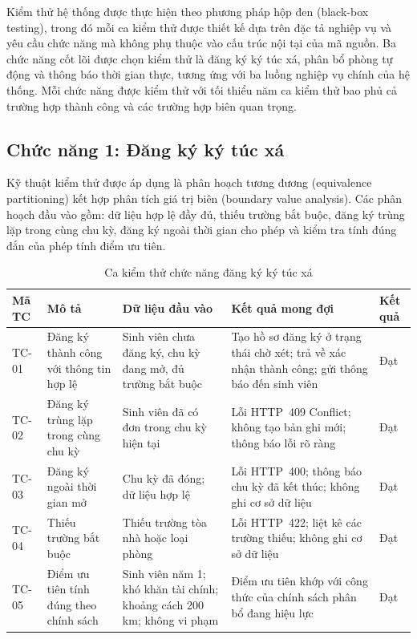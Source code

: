 \documentclass[../DoAn.tex]{subfiles}
\begin{document}
Kiểm thử hệ thống được thực hiện theo phương pháp hộp đen (black-box testing),
trong đó mỗi ca kiểm thử được thiết kế dựa trên đặc tả nghiệp vụ và yêu cầu
chức năng mà không phụ thuộc vào cấu trúc nội tại của mã nguồn. Ba chức năng
cốt lõi được chọn kiểm thử là đăng ký ký túc xá, phân bổ phòng tự động và thông
báo thời gian thực, tương ứng với ba luồng nghiệp vụ chính của hệ thống. Mỗi
chức năng được kiểm thử với tối thiểu năm ca kiểm thử bao phủ cả trường hợp
thành công và các trường hợp biên quan trọng.

\subsection*{Chức năng 1: Đăng ký ký túc xá}

Kỹ thuật kiểm thử được áp dụng là phân hoạch tương đương (equivalence
partitioning) kết hợp phân tích giá trị biên (boundary value analysis). Các
phân hoạch đầu vào gồm: dữ liệu hợp lệ đầy đủ, thiếu trường bắt buộc, đăng ký
trùng lặp trong cùng chu kỳ, đăng ký ngoài thời gian cho phép và kiểm tra tính
đúng đắn của phép tính điểm ưu tiên.

\vspace{-6pt}
\begin{table}[H]
\centering
\caption{Ca kiểm thử chức năng đăng ký ký túc xá}
\label{tab:tc_registration}
\footnotesize

\begin{tabular}{|p{1.1cm}|p{2.5cm}|p{3.2cm}|p{4.0cm}|p{1.2cm}|}
\hline
\textbf{Mã TC} &
\textbf{Mô tả} &
\textbf{Dữ liệu đầu vào} &
\textbf{Kết quả mong đợi} &
\textbf{Kết quả} \\
\hline

TC-01 &
Đăng ký thành công với thông tin hợp lệ &
Sinh viên chưa đăng ký, chu kỳ đang mở, đủ trường bắt buộc &
Tạo hồ sơ đăng ký ở trạng thái chờ xét; trả về xác nhận thành công; gửi thông báo đến sinh viên &
Đạt \\
\hline

TC-02 &
Đăng ký trùng lặp trong cùng chu kỳ &
Sinh viên đã có đơn trong chu kỳ hiện tại &
Lỗi HTTP~409 Conflict; không tạo bản ghi mới; thông báo lỗi rõ ràng &
Đạt \\
\hline

TC-03 &
Đăng ký ngoài thời gian mở &
Chu kỳ đã đóng; dữ liệu hợp lệ &
Lỗi HTTP~400; thông báo chu kỳ đã kết thúc; không ghi cơ sở dữ liệu &
Đạt \\
\hline

TC-04 &
Thiếu trường bắt buộc &
Thiếu trường tòa nhà hoặc loại phòng &
Lỗi HTTP~422; liệt kê các trường thiếu; không ghi cơ sở dữ liệu &
Đạt \\
\hline

TC-05 &
Điểm ưu tiên tính đúng theo chính sách &
Sinh viên năm 1; khó khăn tài chính; khoảng cách 200 km; không vi phạm &
Điểm ưu tiên khớp với công thức của chính sách phân bổ đang hiệu lực &
Đạt \\
\hline

\end{tabular}
\end{table}
\vspace{-4pt}
\end{document}
